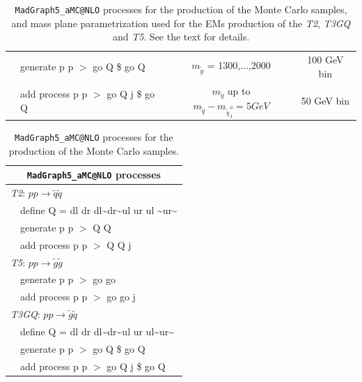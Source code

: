 \documentclass[a4paper,11pt]{article}
\newcommand{\TGQ}{ \textit{T3GQ}}
\newcommand{\Ttwo}{ \textit{T2}}
\newcommand{\Tfive}{ \textit{T5}}
\begin{document}
\begin{table}
\begin{center}
\begin{tabular}{ l l | c c  }
			&  generate p p $>$ go Q \$ go Q & $m_{\tilde g}$ = 1300,...,2000 & 100 GeV bin \\
			
			&  add process p p $>$ go Q j \$ go Q & $m_{\tilde q}$ up to $m_{\tilde q}-m_{\tilde \chi _1 ^0}=5 GeV $ & 50 GeV bin \\  \bottomrule \bottomrule 
		\end{tabular}
	\caption{\texttt{MadGraph5\_aMC@NLO} processes for the production of the Monte Carlo samples, and mass plane parametrization used for the EMs production of the \textit{T2}, \textit{T3GQ} and \textit{T5}. See the text for details. }
	\label{TGQ_Planes} 
\end{center}
\end{table}
\normalsize
\iffalse
\begin{table}
	\small
	\renewcommand{\arraystretch}{1.0}
	\begin{tabular}{ l l }  \toprule  \toprule 
		\multicolumn{2}{c}{\texttt{MadGraph5\_aMC@NLO} processes} \\ \toprule \toprule
		\multicolumn{2}{l}{\Ttwo: $p p \rightarrow \tilde q \tilde q$}  \\
		& define Q = dl dr dl\textasciitilde dr\textasciitilde ul ur ul \textasciitilde ur\textasciitilde \\
		& generate p p $>$ Q Q  \\
		&  add process p p $>$ Q Q j \\  \toprule 
		\multicolumn{2}{l}{\Tfive: $p p \rightarrow \tilde g \tilde g$ } \\ 
		& generate p p $>$ go go \\
		&  add process p p $>$ go go j \\ \toprule 
		\multicolumn{2}{l}{\TGQ: $p p \rightarrow \tilde g \tilde q$} \\  
		&  define Q = dl dr dl\textasciitilde dr\textasciitilde ul ur ul\textasciitilde ur\textasciitilde \\
		&  generate p p $>$ go Q \$ go Q \\
		&  add process p p $>$ go Q j \$ go Q \\  \bottomrule \bottomrule 
	\end{tabular}
	\normalsize
	\caption{\texttt{MadGraph5\_aMC@NLO} processes for the production of the Monte Carlo samples.}

\end{table}
\end{document}
